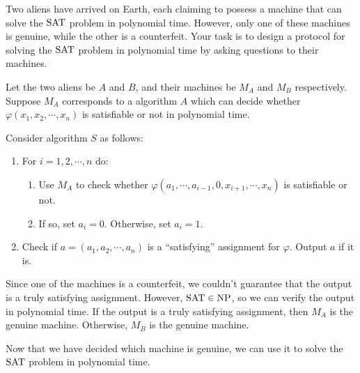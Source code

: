 \documentclass{homework}
\begin{document}
\begin{problem}
  Two aliens have arrived on Earth, each claiming to possess a machine that can
  solve the $\mathrm{SAT}$ problem in polynomial time.
  However, only one of these machines is genuine, while the other is a
  counterfeit.
  Your task is to design a protocol for solving the $\mathrm{SAT}$ problem in polynomial
  time by asking questions to their machines.
\end{problem}

\begin{solution}
  
  Let the two aliens be $A$ and $B$,
  and their machines be $M_{A}$ and $M_{B}$ respectively.
  Suppose $M_{A}$ corresponds to a algorithm $A$
  which can decide whether $\varphi(x_1, x_2, \cdots, x_n)$
  is satisfiable or not in polynomial time.
  
  Consider algorithm $S$ as follows:
  \begin{enumerate}
    \item For $i = 1, 2, \cdots, n$ do:
    \begin{enumerate}
      \item Use $M_{A}$ to check whether
        $\varphi(a_1, \cdots, a_{i-1}, 0, x_{i+1}, \cdots, x_n)$
        is satisfiable or not.
      \item If so, set $a_i = 0$. Otherwise, set $a_i = 1$.
    \end{enumerate}
    \item Check if $a = (a_1, a_2, \cdots, a_n)$ is a ``satisfying'' assignment for $\varphi$.
      Output $a$ if it is.
  \end{enumerate}

  Since one of the machines is a counterfeit,
  we couldn't guarantee that the output is a truly satisfying assignment.
  However, $\mathrm{SAT} \in \textup{NP}$, so we can verify the output in polynomial time.
  If the output is a truly satisfying assignment, then $M_A$ is the genuine machine.
  Otherwise, $M_B$ is the genuine machine.

  Now that we have decided which machine is genuine,
  we can use it to solve the $\mathrm{SAT}$ problem in polynomial time.

\end{solution}


\end{document}
